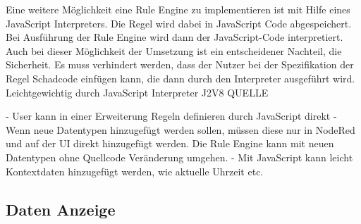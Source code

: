 Eine weitere Möglichkeit eine Rule Engine zu implementieren ist mit Hilfe eines JavaScript Interpreters. Die Regel wird dabei in JavaScript Code abgespeichert. Bei Ausführung der Rule Engine wird dann der JavaScript-Code interpretiert. Auch bei dieser Möglichkeit der Umsetzung ist ein entscheidener Nachteil, die Sicherheit. Es muss verhindert werden, dass der Nutzer bei der Spezifikation der Regel Schadcode einfügen kann, die dann durch den Interpreter ausgeführt wird.
Leichtgewichtig durch JavaScript Interpreter J2V8 QUELLE

- User kann in einer Erweiterung Regeln definieren durch JavaScript direkt
- Wenn neue Datentypen hinzugefügt werden sollen, müssen diese nur in NodeRed und auf der UI direkt hinzugefügt werden. Die Rule Engine kann mit neuen Datentypen ohne Quellcode Veränderung umgehen.
- Mit JavaScript kann leicht Kontextdaten hinzugefügt werden, wie aktuelle Uhrzeit etc.



\subsection{Daten Anzeige}